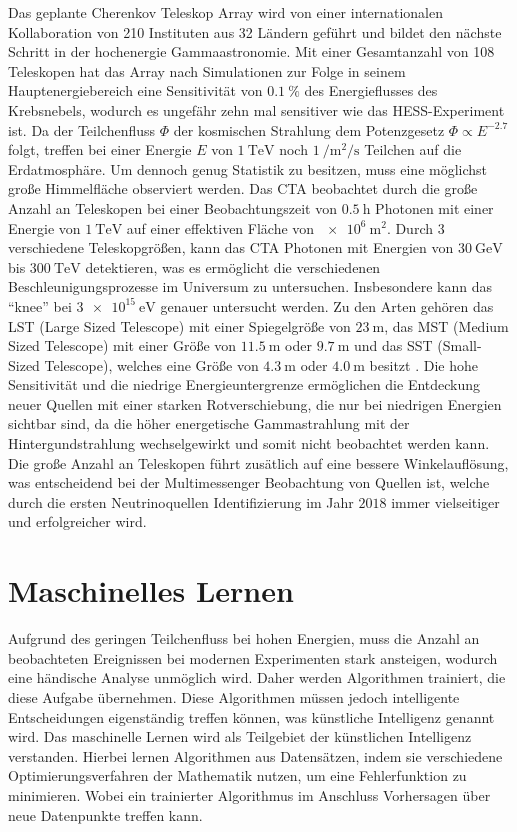Das geplante Cherenkov Teleskop Array wird von einer internationalen Kollaboration von 210 Instituten aus 32 Ländern\cite{CTA_consortium} geführt
und bildet den nächste Schritt in der hochenergie Gammaastronomie.
Mit einer Gesamtanzahl von 108 Teleskopen hat das Array nach Simulationen zur Folge in seinem Hauptenergiebereich eine Sensitivität von $\SI{0.1}{\percent}$
des Energieflusses des Krebsnebels, wodurch es ungefähr zehn mal sensitiver wie das HESS-Experiment ist\cite{CTA_paper}.
Da der Teilchenfluss $\Phi$ der kosmischen Strahlung dem Potenzgesetz $\Phi \propto E^{-2.7}$\cite[5]{Cosmic_rays} folgt,
treffen bei einer Energie $E$ von $\SI{1}{\tera\eV}$ noch $\SI{1}{\per\m\squared\per\s}$ Teilchen auf die Erdatmosphäre.
Um dennoch genug Statistik zu besitzen, muss eine möglichst große Himmelfläche observiert werden.
Das CTA beobachtet durch die große Anzahl an Teleskopen bei einer Beobachtungszeit von $\SI{0.5}{\hour}$ Photonen mit einer Energie von $\SI{1}{\tera\eV}$ auf einer
effektiven Fläche von $\SI{e6}{\m\squared}$\cite{CTA_ob}.
Durch 3 verschiedene Teleskopgrößen, kann das CTA Photonen mit Energien von $\SI{30}{\giga\eV}$ bis $\SI{300}{\tera\eV}$ detektieren,
was es ermöglicht die verschiedenen Beschleunigungsprozesse im Universum zu untersuchen.
Insbesondere kann das \enquote{knee} bei $\SI{3e15}{\eV}$ genauer untersucht werden.
Zu den Arten gehören das LST (Large Sized Telescope) mit einer Spiegelgröße von $\SI{23}{\m}$, das MST (Medium Sized Telescope)
mit einer Größe von $\SI{11.5}{\m}$ oder $\SI{9.7}{\m}$ und das SST (Small-Sized Telescope), welches eine Größe von $\SI{4.3}{\m}$ oder $\SI{4.0}{\m}$
besitzt\cite{CTA_tec} .
Die hohe Sensitivität und die niedrige Energieuntergrenze ermöglichen die Entdeckung neuer Quellen mit einer starken Rotverschiebung, die nur bei niedrigen
Energien sichtbar sind, da die höher energetische Gammastrahlung mit der Hintergundstrahlung wechselgewirkt und somit nicht beobachtet werden kann.
Die große Anzahl an Teleskopen führt zusätlich auf eine bessere Winkelauflösung, was entscheidend bei der Multimessenger Beobachtung von Quellen ist, welche
durch die ersten Neutrinoquellen Identifizierung im Jahr $2018$ immer vielseitiger und erfolgreicher wird.

\section{Maschinelles Lernen}
\label{sec:ML}

Aufgrund des geringen Teilchenfluss bei hohen Energien, muss die Anzahl an beobachteten Ereignissen bei modernen
Experimenten stark ansteigen, wodurch eine händische Analyse unmöglich wird.
Daher werden Algorithmen trainiert, die diese Aufgabe übernehmen.
Diese Algorithmen müssen jedoch intelligente Entscheidungen eigenständig treffen können, was künstliche Intelligenz
genannt wird.
Das maschinelle Lernen wird als Teilgebiet der künstlichen Intelligenz verstanden. Hierbei lernen Algorithmen aus Datensätzen,
indem sie verschiedene Optimierungsverfahren der Mathematik nutzen, um eine Fehlerfunktion zu minimieren.
Wobei ein trainierter Algorithmus im Anschluss Vorhersagen über neue Datenpunkte treffen kann.

